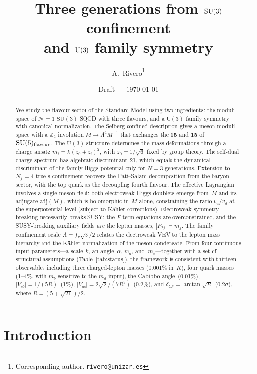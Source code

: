 \documentclass[12pt,a4paper]{article}
\title{Three generations from $\SU(3)$ confinement\\
  and $\UU(3)$ family symmetry}
\author{A.\ Rivero\thanks{Corresponding author. \texttt{rivero@unizar.es}}}
\date{Draft --- \today}
\newcommand{\SU}{\mathrm{SU}}
\newcommand{\UU}{\mathrm{U}}
\newcommand{\Nf}{N_f}
\newcommand{\adj}{\mathrm{adj}}
\begin{document}
\maketitle

\begin{abstract}
  We study the flavour sector of the Standard Model using two
  ingredients: the moduli space of $\mathcal{N}=1$ $\SU(3)$ SQCD with
  three flavours, and a $\UU(3)$ family symmetry with canonical
  normalization. The Seiberg confined description gives a meson moduli
  space with a $\mathbb{Z}_2$ involution $M \to \Lambda^4 M^{-1}$ that
  exchanges the $\mathbf{15}$ and $\overline{\mathbf{15}}$ of
  $\SU(5)_{\rm flavour}$. The $\UU(3)$ structure determines the mass
  deformations through a charge ansatz $m_i = k(z_0 + z_i)^2$, with
  $z_0 = 1/\sqrt{6}$ fixed by group theory. The self-dual charge
  spectrum has algebraic discriminant~21, which equals the dynamical
  discriminant of the family Higgs potential only for $N=3$
  generations. Extension to $\Nf=4$ true s-confinement recovers the
  Pati--Salam decomposition from the baryon sector, with the top quark
  as the decoupling fourth flavour. The effective Lagrangian involves a
  single meson field: both electroweak Higgs doublets emerge from~$M$
  and its adjugate $\adj(M)$, which is holomorphic in~$M$ alone,
  constraining the ratio $v_u/v_d$ at the superpotential level
  (subject to K\"ahler corrections).
  Electroweak symmetry breaking necessarily breaks SUSY:
  the $F$-term equations are overconstrained, and the
  SUSY-breaking auxiliary fields \emph{are} the lepton masses,
  $|F_{2j}| = m_j$.
  The family confinement
  scale $\Lambda = f_\pi\sqrt{3}/2$ relates the electroweak VEV to
  the lepton mass hierarchy and the K\"ahler normalization of the
  meson condensate.
  From four continuous input parameters---a scale~$k$, an
  angle~$\alpha$, $m_d$, and~$m_s$---together with a set of
  structural assumptions (Table~\ref{tab:status}),
  the framework is consistent with thirteen observables including three
  charged-lepton masses (0.001\% in~$K$), four quark masses (1--4\%, with $m_b$
  sensitive to the $m_d$ input), the
  Cabibbo angle~(0.01\%), $|V_{cb}| = 1/(5R)$~(1\%),
  $|V_{ub}| = 2\sqrt{2}/(7R^3)$~(0.2\%), and
  $\delta_{CP} = \arctan\sqrt{R}$~($0.2\sigma$), where
  $R = (5+\sqrt{21})/2$.
\end{abstract}


\section{Introduction}
\label{sec:intro}
\end{document}

